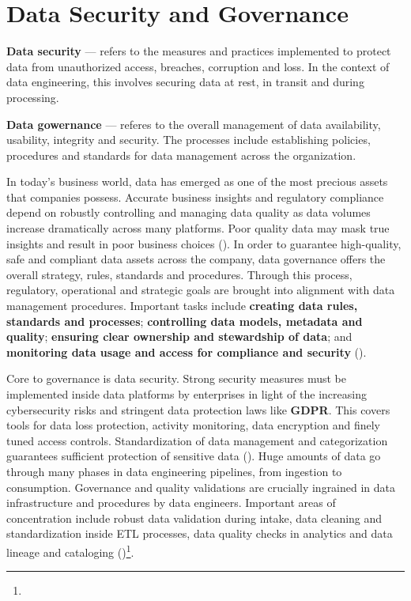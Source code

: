\section{Data Security and Governance}

\textbf{Data security} — refers to the measures and practices implemented to protect data from unauthorized access, breaches, corruption and loss. In the context of data engineering, this involves securing data at rest, in transit and during processing.

\textbf{Data gowernance} — referes to the overall management of data availability, usability, integrity and security. The processes include establishing policies, procedures and standards for data management across the organization.

In today's business world, data has emerged as one of the most precious assets that companies possess. Accurate business insights and regulatory compliance depend on robustly controlling and managing data quality as data volumes increase dramatically across many platforms. Poor quality data may mask true insights and result in poor business choices (\cite{Achanta2023DataGA})\footnotemark[23]. In order to guarantee high-quality, safe and compliant data assets across the company, data governance offers the overall strategy, rules, standards and procedures. Through this process, regulatory, operational and strategic goals are brought into alignment with data management procedures. Important tasks include \textbf{creating data rules, standards and processes}; \textbf{controlling data models, metadata and quality};\textbf{ ensuring clear ownership and stewardship of data}; and \textbf{monitoring data usage and access for compliance and security} (\cite{Achanta2023DataGA})\footnotemark[23].

Core to governance is data security. Strong security measures must be implemented inside data platforms by enterprises in light of the increasing cybersecurity risks and stringent data protection laws like \textbf{GDPR}. This covers tools for data loss protection, activity monitoring, data encryption and finely tuned access controls. Standardization of data management and categorization guarantees sufficient protection of sensitive data (\cite{Achanta2023DataGA})\footnotemark[23]. Huge amounts of data go through many phases in data engineering pipelines, from ingestion to consumption. Governance and quality validations are crucially ingrained in data infrastructure and procedures by data engineers. Important areas of concentration include robust data validation during intake, data cleaning and standardization inside ETL processes, data quality checks in analytics and data lineage and cataloging (\cite{Achanta2023DataGA})\footnote[23]{}.

